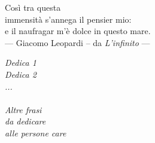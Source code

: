 \thispagestyle{empty}
\vspace*{3cm}

\begin{center}
Così tra questa \\
immensità s'annega il pensier mio: \\
e il naufragar m'è dolce in questo mare. \\
--- Giacomo Leopardi -- da \emph{L'infinito} ---
\end{center}

\medskip

\begin{center}
\hfill \emph{Dedica 1} \\
\hfill \emph{Dedica 2} \\
\hfill \emph{...} \\
~ \\
\hfill \emph{Altre frasi} \\
\hfill \emph{da dedicare} \\
\hfill \emph{alle persone care} \\
\end{center}